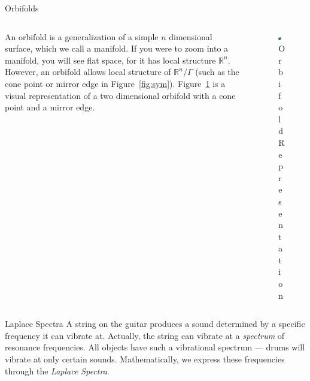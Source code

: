 \documentclass[final]{beamer}
\newlength{\onecolwid}
\begin{document}
\begin{frame}[t]
\begin{columns}[t]
\begin{column}{\onecolwid}
\begin{block}{Orbifolds}
        \begin{columns}[t]
        \begin{column}[t]{0.55\textwidth}
An orbifold is a generalization of a simple $n$ dimensional surface, which we
call a manifold. If you were to zoom into a manifold, you
will see flat space, for it has local structure $\mathbb{R}^n$. However, an
orbifold allows local structure of $\mathbb{R}^n/\Gamma$ (such as the
cone point or mirror edge in Figure~\ref{fig:sym}). Figure~\ref{fig:orb_ex}
is a visual representation of a two dimensional orbifold with a cone point and a mirror
edge.
        \end{column} 
        \begin{column}[t]{0.45\textwidth}
        \begin{figure}
        \includegraphics[width=0.7\textwidth]{images/orbifold_ex.png}
        \caption{Orbifold Representation}
        \label{fig:orb_ex}
        \end{figure}
        \end{column}
        \end{columns}
    \end{block}

    \begin{block}{Laplace Spectra}
A string on the guitar produces a sound determined by a specific frequency
it can vibrate at. Actually, the string can vibrate at a \emph{spectrum} of
resonance frequencies. All objects have such a vibrational spectrum ---
drums will vibrate at only certain sounds. Mathematically, we express these
frequencies through the \emph{Laplace Spectra}.


\end{block}
\end{column}
\end{columns}
\end{frame}
\end{document}
